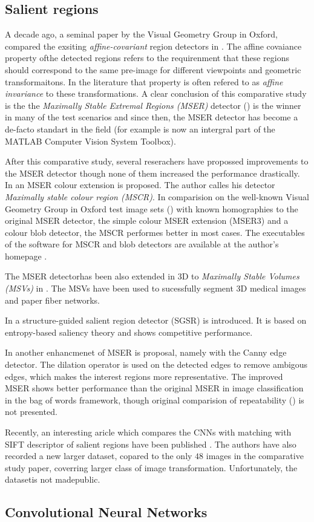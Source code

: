 \subsection{Salient regions}

A decade ago, a seminal paper by the Visual Geometry Group in Oxford, compared the exsiting {\em affine-covariant} region detectors in \cite{Mikolajczyk:2005}. The affine covaiance property ofthe detected regions refers to the requirenment that these regions should correspond to the same pre-image for different viewpoints and geometric transformaitons. In the literature that property is often refered to as {\em affine invariance} to these transformations. A clear conclusion of this comparative study is the the  {\em  Maximally Stable Extremal Regions (MSER)} detector (\cite{Matas2002BMVC}) is the winner in many of the test scenarios and since then, the MSER detector has become a de-facto standart in the field (for example is now an intergral part of the MATLAB Computer Vision System Toolbox).

After this comparative study, several reserachers have propossed improvements to the MSER detector though none of them increased the performance  drastically. 
In \cite{Forssen07} an MSER colour extension is proposed. The author calles his detector {\em Maximally stable colour region (MSCR)}. In comparision on the well-known Visual Geometry Group in Oxford test image sets (\cite{vgg_soft_data}) with known homographies to the original MSER detector, the simple colour MSER extension (MSER3) and a colour blob detector, the MSCR performes better in most cases. The executables of the software for MSCR and blob detectors are available at the author's homepage \cite{forssen07_soft}.

The MSER detectorhas been also extended in 3D to {\em Maximally Stable Volumes (MSVs)} in \cite{DonoserB06}. The MSVs have been used to sucessfully segment 3D medical images and paper fiber networks.

In \cite{Fan08} a structure-guided salient region detector (SGSR) is introduced. It is based on entropy-based saliency theory and shows competitive performance.

In \cite{Wang14} another enhancmenet of MSER is proposal, namely with the Canny edge detector. The dilation operator is used on the detected edges to remove ambigous edges, which makes the interest regions more representative. The improved MSER shows better performance than the original MSER in image classification in the bag of words framework, though original comparision of repeatability (\cite{Mikolajczyk:2005}) is not presented. 

Recently, an interesting aricle which compares the CNNs with matching with SIFT descriptor of salient regions have been published \cite{FischerDB14}. The authors have also recorded a new larger dataset, copared to the only $48$ images in the comparative study paper, coverring larger class of image transformation. Unfortunately, the datasetis not madepublic.

\subsection{Convolutional Neural Networks}